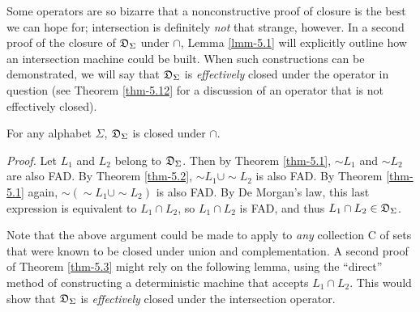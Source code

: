 Some operators are so bizarre that a nonconstructive proof of closure is the
best we can hope for; intersection is definitely \emph{not} that strange,
however. In a second proof of the closure of $\mathfrak{D}_\Sigma$ under $\cap$,
Lemma \ref{lmm-5.1} will explicitly outline how an intersection machine could be built.
When such constructions can be demonstrated, we will say that
$\mathfrak{D}_\Sigma$ is \emph{effectively} closed under the operator in
question (see Theorem \ref{thm-5.12} for a discussion of an operator that is not
effectively closed).

\begin{thm}\label{thm-5.3}
For any alphabet $\Sigma$, $\mathfrak{D}_\Sigma$ is closed under $\cap$.

\emph{Proof.} Let $L_1$ and $L_2$ belong to $\mathfrak{D}_\Sigma$. Then by
Theorem \ref{thm-5.1}, $\sim   L_1$ and $\sim   L_2$ are also FAD. By Theorem \ref{thm-5.2},
$\sim   L_1 \cup \sim   L_2$ is also FAD. By Theorem \ref{thm-5.1} again,
$\sim  (\sim   L_1 \cup \sim   L_2)$ is also FAD. By De Morgan's law, this
last expression is equivalent to $L_1 \cap L_2$, so $L_1 \cap L_2$ is FAD, and
thus $L_1 \cap L_2 \in \mathfrak{D}_\Sigma$.
\end{thm}

Note that the above argument could be made to apply to \emph{any} collection C
of sets that were known to be closed under union and complementation. A second
proof of Theorem \ref{thm-5.3} might rely on the following lemma, using the ``direct''
method of constructing a deterministic machine that accepts $L_1 \cap L_2$. This
would show that $\mathfrak{D}_\Sigma$ is \emph{effectively} closed under the
intersection operator.

